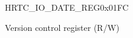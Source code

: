 \begin{register}{H}{RTC\_IO\_DATE\_REG}{0x{}01FC}\label{regdesc:RTCIORTCIODATEREG}
%
%
\regnewline%
\begin{regdesc}\begin{reglist}
\label{fielddesc:RTCIOIODATE}\item [RTC\_IO\_DATE] Version control register (R/W)
\end{reglist}\end{regdesc}
\end{register}


